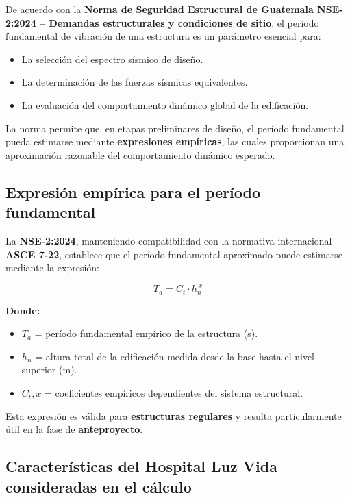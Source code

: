 \documentclass[14pt,letterpaper]{extarticle}
\begin{document}
	De acuerdo con la \textbf{Norma de Seguridad Estructural de Guatemala NSE-2:2024 – Demandas estructurales y condiciones de sitio}, el período fundamental de vibración de una estructura es un parámetro esencial para:
	
	\begin{itemize}
		\item La selección del espectro sísmico de diseño.
		\item La determinación de las fuerzas sísmicas equivalentes.
		\item La evaluación del comportamiento dinámico global de la edificación.
	\end{itemize}
	
	La norma permite que, en etapas preliminares de diseño, el período fundamental pueda estimarse mediante \textbf{expresiones empíricas}, las cuales proporcionan una aproximación razonable del comportamiento dinámico esperado.
	
	\subsection{Expresión empírica para el período fundamental}
	
	La \textbf{NSE-2:2024}, manteniendo compatibilidad con la normativa internacional \textbf{ASCE 7-22}, establece que el período fundamental aproximado puede estimarse mediante la expresión:
	
	\begin{equation}
		T_a = C_t \cdot h_n^{\,x}
	\end{equation}
	
	\textbf{Donde:}
	
	\begin{itemize}
		\item $T_a$ = período fundamental empírico de la estructura (s).
		\item $h_n$ = altura total de la edificación medida desde la base hasta el nivel superior (m).
		\item $C_t, x$ = coeficientes empíricos dependientes del sistema estructural.
	\end{itemize}
	
	Esta expresión es válida para \textbf{estructuras regulares} y resulta particularmente útil en la fase de \textbf{anteproyecto}.
	
	\subsection{Características del Hospital Luz Vida consideradas en el cálculo}
	
\end{document}
